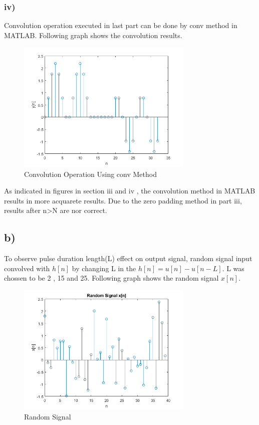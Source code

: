 \documentclass[letterpaper,12pt]{article}
\begin{document}
\subsubsection{iv)}
Convolution operation executed in last part can be done by conv method in MATLAB. Following graph shows the convolution results. 
\begin{figure}[H]
    \centering
    \includegraphics[width = 0.75\textwidth]{i4.png}
    \caption{Convolution Operation Using conv Method}
    \end{figure} 
    As indicated in figures in section iii and iv , the convolution method in MATLAB results in more acquarete results. Due to the zero padding method in part iii, results after n>N are nor correct.


\subsection{b)}
To observe pulse duration length(L) effect on output signal, random signal input convolved with \(h[n]\) by changing L in the \(h[n] = u[n] - u[n-L]\). L was chossen to be 2 , 15 and 25.
Following graph shows the random signal \(x[n]\).
\begin{figure}[H]
    \centering
    \includegraphics[width = 0.75\textwidth]{b_signal.png}
    \caption{Random Signal}
    \end{figure} 
\end{document}
